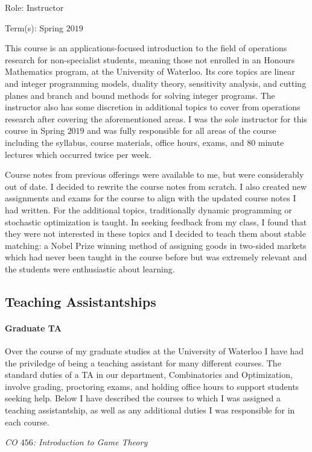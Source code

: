 \documentclass{article}
\begin{document}
 Role: Instructor
 
 Term(s): Spring $2019$

This course is an applications-focused introduction to the field of operations research for non-specialist students, meaning those not enrolled in an Honours Mathematics program, at the University of Waterloo. Its core topics are linear and integer programming models, duality theory, sensitivity analysis, and cutting planes and branch and bound methods for solving integer programs. The instructor also has some discretion in additional topics to cover from operations research after covering the aforementioned areas. I was the sole instructor for this course in Spring $2019$ and was fully responsible for all areas of the course including the syllabus, course materials, office hours, exams, and $80$ minute lectures which occurred twice per week. 

Course notes from previous offerings were available to me, but were considerably out of date. I decided to rewrite the course notes from scratch. I also created new assignments and exams for the course to align with the updated course notes I had written. For the additional topics, traditionally dynamic programming or stochastic optimization is taught. In seeking feedback from my class, I found that they were not interested in these topics and I decided to teach them about stable matching: a Nobel Prize winning method of assigning goods in two-sided markets which had never been taught in the course before but was extremely relevant and the students were enthusiastic about learning.

\subsection{Teaching Assistantships}
\paragraph{Graduate TA}Over the course of my graduate studies at the University of Waterloo I have had the priviledge of being a teaching assistant for many different courses. The standard duties of a TA in our department, Combinatorics and Optimization, involve grading, proctoring exams, and holding office hours to support students seeking help. Below I have described the courses to which I was assigned a teaching assistantship, as well as any additional duties I was responsible for in each course.
\bigskip

\noindent\emph{CO $456$: Introduction to Game Theory}
\end{document}
